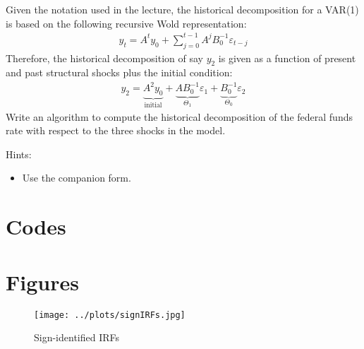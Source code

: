 \documentclass{article}
\begin{document}
Given the notation used in the lecture, the historical decomposition for a VAR{(1)}
is based on the following recursive Wold representation:
\begin{align*}
y_t = A^t y_0 + \sum_{j=0}^{t-1} A^j B_0^{-1} \varepsilon_{t-j}
\end{align*}
Therefore, the historical decomposition of say \(y_{2}\) is given as a function of present and past structural shocks
plus the initial condition:
\begin{align*}
y_{2} = \underbrace{A^2 y_0}_{\text{initial}} + \underbrace{A B_0^{-1}}_{\Theta_1} \varepsilon_{1} + \underbrace{B_0^{-1}}_{\Theta_0} \varepsilon_{2}
\end{align*}
Write an algorithm to compute the historical decomposition of the federal funds rate with respect to the three shocks in the model.

Hints:
\begin{itemize}
	\item Use the companion form.
\end{itemize} 

\newpage
\appendix

\printbibliography
\newpage
\section{Codes}


\newpage

\section{Figures}
\begin{figure}[htbp]\caption[]{Sign-identified IRFs}\label{fig:signSVAR}
	\texttt{[image: ../plots/signIRFs.jpg]}
\end{figure}
\end{document}
